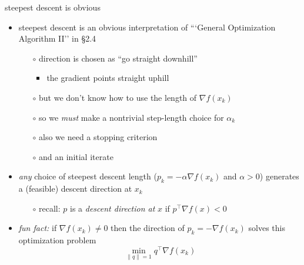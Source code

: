 \documentclass[10pt,hyperref]{beamer}
\newcommand{\grad}{\nabla}
\begin{document}
\begin{frame}{steepest descent is obvious}

\begin{itemize}
\item steepest descent is an obvious interpretation of ```General Optimization Algorithm II'' in \S 2.4
    \begin{itemize}
    \item[$\circ$] direction is chosen as ``go straight downhill''
        \begin{itemize}
        \item the gradient points straight uphill
        \end{itemize}
    \item[$\circ$] \alert{but we don't know how to use the length of $\grad f(x_k)$}
    \item[$\circ$] so we \emph{must} make a nontrivial step-length choice for $\alpha_k$
    \item[$\circ$] also we need a stopping criterion
    \item[$\circ$] and an initial iterate
    \end{itemize}

\medskip
\item \emph{any} choice of steepest descent length ($p_k = - \alpha \grad f(x_k)$ and $\alpha>0$) generates a (feasible) descent direction at $x_k$
    \begin{itemize}
    \item[$\circ$] recall: $p$ is a \emph{descent direction at} $x$ if $p^\top \grad f(x)<0$
    \end{itemize}

\medskip
\item \emph{fun fact:} if $\grad f(x_k)\ne 0$ then the direction of $p_k = - \grad f(x_k)$ solves this optimization problem
    $$\min_{\|q\|=1} q^\top \grad f(x_k)$$
\end{itemize}
\end{frame}
\end{document}
